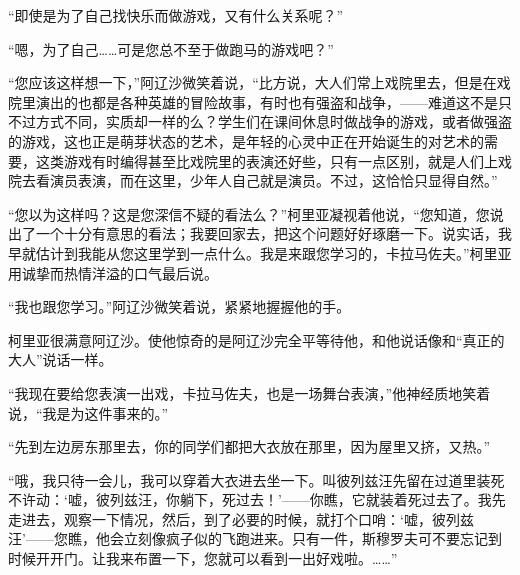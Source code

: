 \par “即使是为了自己找快乐而做游戏，又有什么关系呢？”
\par “嗯，为了自己……可是您总不至于做跑马的游戏吧？”
\par “您应该这样想一下，”阿辽沙微笑着说，“比方说，大人们常上戏院里去，但是在戏院里演出的也都是各种英雄的冒险故事，有时也有强盗和战争，——难道这不是只不过方式不同，实质却一样的么？学生们在课间休息时做战争的游戏，或者做强盗的游戏，这也正是萌芽状态的艺术，是年轻的心灵中正在开始诞生的对艺术的需要，这类游戏有时编得甚至比戏院里的表演还好些，只有一点区别，就是人们上戏院去看演员表演，而在这里，少年人自己就是演员。不过，这恰恰只显得自然。”
\par “您以为这样吗？这是您深信不疑的看法么？”柯里亚凝视着他说，“您知道，您说出了一个十分有意思的看法；我要回家去，把这个问题好好琢磨一下。说实话，我早就估计到我能从您这里学到一点什么。我是来跟您学习的，卡拉马佐夫。”柯里亚用诚挚而热情洋溢的口气最后说。
\par “我也跟您学习。”阿辽沙微笑着说，紧紧地握握他的手。
\par 柯里亚很满意阿辽沙。使他惊奇的是阿辽沙完全平等待他，和他说话像和“真正的大人”说话一样。
\par “我现在要给您表演一出戏，卡拉马佐夫，也是一场舞台表演，”他神经质地笑着说，“我是为这件事来的。”
\par “先到左边房东那里去，你的同学们都把大衣放在那里，因为屋里又挤，又热。”
\par “哦，我只待一会儿，我可以穿着大衣进去坐一下。叫彼列兹汪先留在过道里装死不许动：‘嘘，彼列兹汪，你躺下，死过去！’——你瞧，它就装着死过去了。我先走进去，观察一下情况，然后，到了必要的时候，就打个口哨：‘嘘，彼列兹汪’——您瞧，他会立刻像疯子似的飞跑进来。只有一件，斯穆罗夫可不要忘记到时候开开门。让我来布置一下，您就可以看到一出好戏啦。……”
